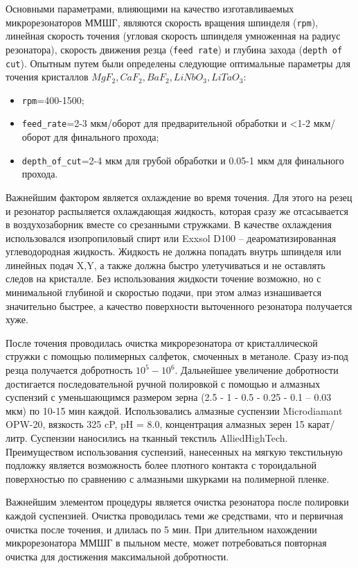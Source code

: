 Основными параметрами, влияющими на качество изготавливаемых микрорезонаторов ММШГ, являются скорость вращения шпинделя (\texttt{rpm}), линейная скорость точения (угловая скорость шпинделя умноженная на радиус резонатора), скорость движения резца (\texttt{feed rate}) и глубина захода (\texttt{depth of cut}). Опытным путем были определены следующие оптимальные параметры для точения кристаллов $MgF_2, CaF_2, BaF_2, LiNbO_3, LiTaO_3$:

\begin{itemize}
    \item \texttt{rpm}=400-1500;
    \item \texttt{feed\_rate}=2-3 мкм/оборот для предварительной обработки и <1-2 мкм/оборот для финального прохода;
    \item \texttt{depth\_of\_cut}=2-4 мкм для грубой обработки и 0.05-1 мкм для финального прохода.
\end{itemize}

Важнейшим фактором является охлаждение во время точения. Для этого на резец и резонатор распыляется охлаждающая жидкость, которая сразу же отсасывается в воздухозаборник вместе со срезанными стружками. В качестве охлаждения использовался изопропиловый спирт или Exxsol D100 – деароматизированная углеводородная жидкость. Жидкость не должна попадать внутрь шпинделя или линейных подач X,Y, а также должна быстро улетучиваться и не оставлять следов на кристалле. Без использования жидкости точение возможно, но с минимальной глубиной и скоростью подачи, при этом алмаз изнашивается значительно быстрее, а качество поверхности выточенного резонатора получается хуже.

После точения проводилась очистка микрорезонатора от кристаллической стружки с помощью полимерных салфеток, смоченных в метаноле. Сразу из-под резца получается добротность $10^5 - 10^6$. Дальнейшее увеличение добротности достигается последовательной ручной полировкой с помощью и алмазных суспензий с уменьшающимся размером зерна (2.5 - 1 - 0.5 - 0.25 - 0.1 – 0.03 мкм) по 10-15 мин каждой. Использовались алмазные суспензии Microdiamant OPW-20, вязкость 325 cP, pH = 8.0, концентрация алмазных зерен 15 карат/литр. Суспензии наносились на тканный текстиль AlliedHighTech. Преимуществом использования суспензий, нанесенных на мягкую текстильную подложку является возможность более плотного контакта с тороидальной поверхностью по сравнению с алмазными шкурками на полимерной пленке.

Важнейшим элементом процедуры является очистка резонатора после полировки каждой суспензией. Очистка проводилась теми же средствами, что и первичная очистка после точения, и длилась по 5 мин. При длительном нахождении микрорезонатора ММШГ в пыльном месте, может потребоваться повторная очистка для достижения максимальной добротности.

